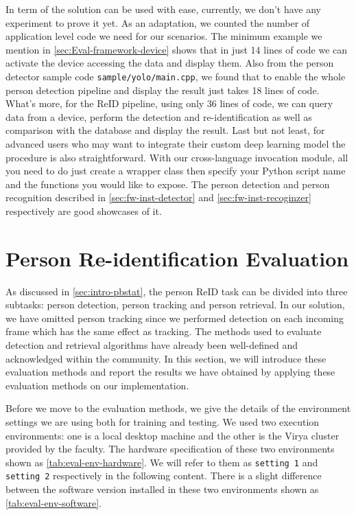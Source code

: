 In term of the solution can be used with ease, currently, we don't have any
experiment to prove it yet. As an adaptation, we counted the
number of application level code we need for our scenarios.
The minimum example we mention in \autoref{sec:Eval-framework-device} shows 
that in just 14 lines of code
we can activate the device accessing the data and display them. Also from the
person detector sample code \texttt{sample/yolo/main.cpp}, we found
that to enable the whole person detection pipeline and display the result just
takes 18 lines of code. What's more, for the ReID pipeline, using only 36 lines 
of code, we can query data from a device, perform the detection and 
re-identification as well as comparison with the database and display 
the result. Last but not least, for advanced users who may want to integrate 
their custom deep learning model the procedure is also straightforward. With 
our cross-language invocation module, all you need to do just create a wrapper 
class then specify your Python script name and the functions you would like to 
expose. The person detection and person recognition described in 
\autoref{sec:fw-inst-detector} and \autoref{sec:fw-inst-recoginzer} 
respectively are good showcases of it.

\section{Person Re-identification Evaluation}
\label{sec:Eval-reid-app}

As discussed in \autoref{sec:intro-pbstat}, the person ReID task can be
divided into three subtasks: person detection, person tracking and
person retrieval. In our solution, we have omitted person tracking
since we performed detection on each incoming frame which has the
same effect as tracking. The methods used to evaluate detection and
retrieval algorithms have already been well-defined and acknowledged
within the community. In this section, we will introduce these
evaluation methods and report the results we have obtained by applying 
these evaluation methods on our implementation.

Before we move to the evaluation methods, we give the details of the
environment settings we are using both for training and testing.
We used two execution environments: one is a local desktop machine
and the other is the Virya cluster provided by the faculty. The hardware
specification of these two environments shown as
\autoref{tab:eval-env-hardware}. We will refer to them as \texttt{setting 1}
and \texttt{setting 2} respectively in the following content. There is a slight
difference between the software version installed in these two environments
shown as
\autoref{tab:eval-env-software}.

